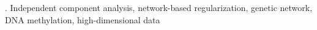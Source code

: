 \documentclass[12pt]{article}
\begin{document}
\vskip 2mm

.
Independent component analysis, network-based regularization, genetic network, DNA methylation, high-dimensional data


%
%
%







\end{document}
